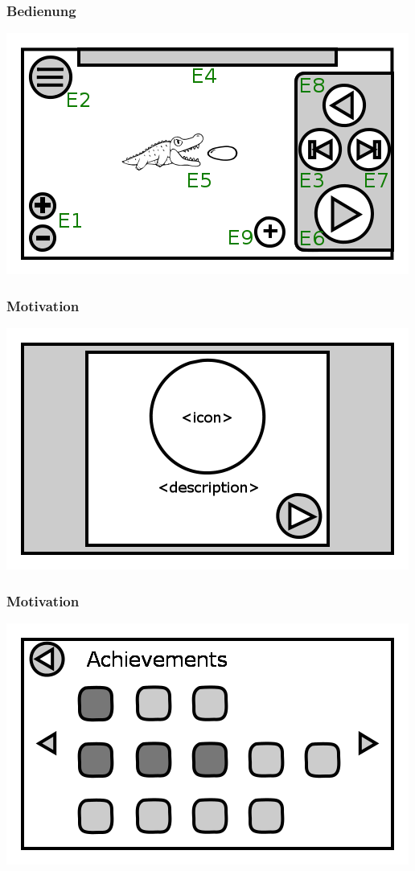 \documentclass[t]{beamer}
\begin{document}
\begin{frame}
	\frametitle{Bedienung}
	\includegraphics[height=\textheight]{level_simulation.png}
\end{frame}
\begin{frame}
	\frametitle{Motivation}
	\includegraphics[height=\textheight]{achievement_notification.png}
\end{frame}
\begin{frame}
	\frametitle{Motivation}
	\includegraphics[height=\textheight]{achievements.png}
\end{frame}
\end{document}
